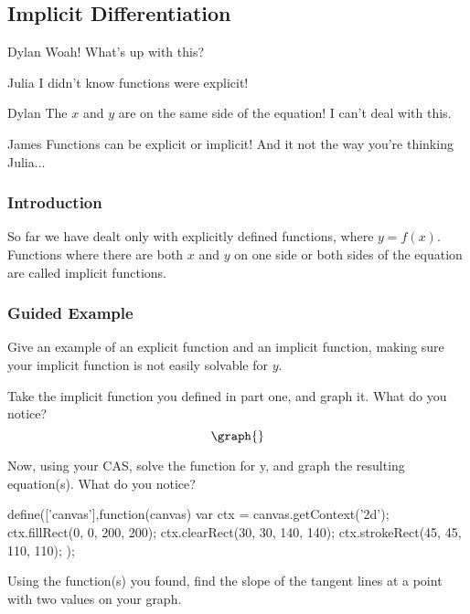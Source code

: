 \documentclass{ximera}
\begin{document}
\subsection{Implicit Differentiation}
\begin{dialogue}
\item[Dylan] Woah! What's up with this?
\item[Julia] I didn't know functions were explicit!
\item[Dylan] The $x$ and $y$ are on the same side of the equation! I can't deal with this.
\item[James] Functions can be explicit or implicit! And it not the way you're thinking Julia...
\end{dialogue}
\subsubsection{Introduction}
So far we have dealt only with explicitly defined functions, where $y=f(x)$.  Functions where there are both $x$ and $y$ on one side or both sides of the equation are called implicit functions.
\subsubsection{Guided Example}
\begin{question}
Give an example of an explicit function and an implicit function, making sure your implicit function is not easily solvable for $y$.
\begin{freeResponse}
\end{freeResponse}
\end{question}
\begin{question}
Take the implicit function you defined in part one, and graph it. What do you notice?
\[
\graph{}
\]
\begin{freeResponse}
\end{freeResponse}
\end{question}
Now, using your CAS, solve the function for y, and graph the resulting equation(s). What do you notice?
\begin{javascript}
define(['canvas'],function(canvas) {
    var ctx = canvas.getContext('2d');
    ctx.fillRect(0, 0, 200, 200);
    ctx.clearRect(30, 30, 140, 140);
    ctx.strokeRect(45, 45, 110, 110);
});
\end{javascript}

Using the function(s) you found, find the slope of the tangent lines at a point with two values on your graph.
\end{document}
